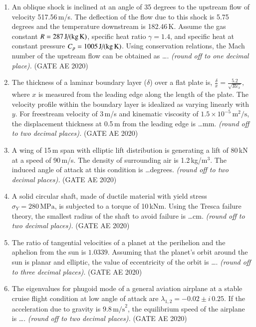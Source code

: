 \documentclass[journal,12pt,onecolumn]{IEEEtran}
\theoremstyle{remark}
\begin{document}
\begin{enumerate}
\item An oblique shock is inclined at an angle of 35 degrees to the upstream flow of velocity 517.56\,m/s. The deflection of the flow due to this shock is 5.75 degrees and the temperature downstream is 182.46\,K. Assume the gas constant $R = 287\,\text{J/(kg\,K)}$, specific heat ratio $\gamma = 1.4$, and specific heat at constant pressure $C_p = 1005\,\text{J/(kg\,K)}$. Using conservation relations, the Mach number of the upstream flow can be obtained as \dots.  \textit{(round off to one decimal place).}
\hfill(GATE AE 2020)

\item The thickness of a laminar boundary layer ($\delta$) over a flat plate is,
$
\frac{\delta}{x} = \frac{5.2}{\sqrt{Re_x}},
$
where $x$ is measured from the leading edge along the length of the plate. The velocity profile within the boundary layer is idealized as varying linearly with $y$. For freestream velocity of 3\,m/s and kinematic viscosity of $1.5 \times 10^{-5}\,\text{m}^2/\text{s}$, the displacement thickness at 0.5\,m from the leading edge is \dots mm. \textit{(round off to two decimal places).}
\hfill(GATE AE 2020)

\item A wing of 15\,m span with elliptic lift distribution is generating a lift of 80\,kN at a speed of 90\,m/s. The density of surrounding air is 1.2\,kg/m$^3$. The induced angle of attack at this condition is \dots degrees. \textit{(round off to two decimal places).}
\hfill(GATE AE 2020)

\item A solid circular shaft, made of ductile material with yield stress $\sigma_Y = 280\,\text{MPa}$, is subjected to a torque of 10\,kNm. Using the Tresca failure theory, the smallest radius of the shaft to avoid failure is \dots cm. \textit{(round off to two decimal places).}
\hfill(GATE AE 2020)

\item The ratio of tangential velocities of a planet at the perihelion and the aphelion from the sun is $1.0339$. Assuming that the planet's orbit around the sun is planar and elliptic, the value of eccentricity of the orbit is \dots. \textit{(round off to three decimal places).}
\hfill(GATE AE 2020)

\item The eigenvalues for phugoid mode of a general aviation airplane at a stable cruise flight condition at low angle of attack are $\lambda_{1,2} = -0.02 \pm i\,0.25$. If the acceleration due to gravity is $9.8\,\text{m/s}^2$, the equilibrium speed of the airplane is \dots {}. \textit{(round off to two decimal places).}
\hfill(GATE AE 2020)


\end{enumerate}
\end{document}
